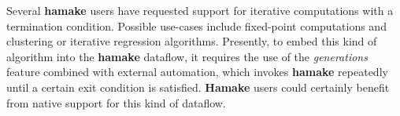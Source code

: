 \documentclass[a4paper,twoside]{article}
\begin{document}
Several \textbf{hamake} users have requested support for iterative computations with a termination condition. Possible use-cases include fixed-point computations and clustering or iterative regression algorithms. Presently, to embed this kind of algorithm into the \textbf{hamake} dataflow, it requires the use of the \textit{generations} feature combined with external automation, which invokes \textbf{hamake} repeatedly until a certain exit condition is satisfied. \textbf{Hamake} users could
certainly benefit from native support for this kind of dataflow.

\vfill



\vfill
\end{document}
